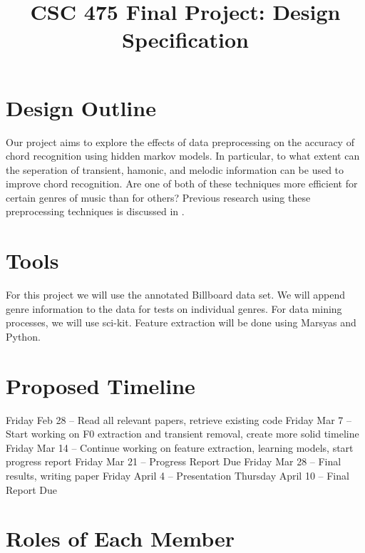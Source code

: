 \documentclass{article}
\title{CSC 475 Final Project: Design Specification}
\begin{document}
%
\maketitle
%

\section{Design Outline}\label{sec:desoutline}
Our project aims to explore the effects of data preprocessing on the accuracy
of chord recognition using hidden markov models. In particular, to what extent
can the seperation of transient, hamonic, and melodic information can be used to
improve chord recognition. Are one of both of these techniques more efficient
for certain genres of music than for others? Previous research using these
preprocessing techniques is discussed in \cite{McVicar:00}.

\section{Tools}\label{sec:tools}

For this project we will use the annotated Billboard data set. We will
append genre information to the data for tests on individual genres. For data
mining processes, we will use sci-kit. Feature extraction will be done using
Marsyas and Python.

\section{Proposed Timeline}\label{sec:timeline}

Friday Feb 28 -- Read all relevant papers, retrieve existing code \newline
Friday Mar 7 -- Start working on F0 extraction and transient removal, create
more solid timeline \newline Friday Mar 14 -- Continue working on feature
extraction, learning models, start progress report \newline Friday Mar 21 --
Progress Report Due \newline Friday Mar 28 -- Final results, writing paper
\newline Friday April 4 -- Presentation \newline Thursday April 10 -- Final
Report Due

\section{Roles of Each Member}
\end{document}
